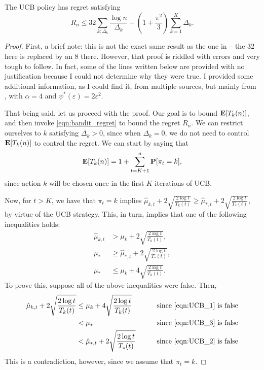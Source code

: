 \begin{theorem}
The UCB policy has regret satisfying
\[
R_n \leq 32 \sum_{k : \Delta_k} \frac{\log n}{\Delta_k} + \left(1 + \frac{\pi^2}{3} \right) \sum_{k=1}^K \Delta_k.
\]
\end{theorem}

\begin{proof}
First, a brief note: this is not the exact same result as the one in \cite[Lecture~18]{rigollet} -- the 32 here is replaced by an 8 there. However, that proof is riddled with errors and very tough to follow. In fact, some of the lines written below are provided with no justification because I could not determine why they were true. I provided some additional information, as I could find it, from multiple sources, but mainly from \cite[Theorem~2.1]{bubeck2012regret}, with $\alpha = 4$ and $\psi^*(\varepsilon) = 2 \varepsilon^2$.

That being said, let us proceed with the proof. Our goal is to bound $\mathbf{E}[T_k(n)]$, and then invoke \eqref{eqn:bandit_regret} to bound the regret $R_n$. We can restrict ourselves to $k$ satisfying $\Delta_k > 0$,  since when $\Delta_k = 0$, we do not need to control $\mathbf{E} [T_k(n)]$ to control the regret. We can start by saying that
\[
\mathbf{E}[T_k(n)] = 1 + \sum_{t=K+1}^n \mathbf{P}[\pi_t = k],
\]
since action $k$ will be chosen once in the first $K$ iterations of UCB.

Now, for $t > K$, we have that $\pi_t = k$ implies $\hat \mu_{k, t} + 2 \sqrt{\frac{2 \log t}{T_k(t)}} \geq \hat \mu_{*, t} + 2 \sqrt{\frac{2 \log t}{T_*(t)}}$, by virtue of the UCB strategy. This, in turn, implies that one of the following inequalities holds:
\begin{align}
\hat \mu_{k, t} &> \mu_k + 2 \sqrt{\frac{2 \log t}{T_k(t)}}, \label{eqn:UCB_1} \\
\mu_* &\geq \hat \mu_{*, t} + 2 \sqrt{\frac{2 \log t}{T_*(t)}}, \label{eqn:UCB_2}\\
\mu_* &\leq \mu_k + 4 \sqrt{\frac{2 \log t}{T_k(t)}}. \label{eqn:UCB_3}
\end{align}
To prove this, suppose all of the above inequalities were false. Then,
\begin{align*}
\hat \mu_{k, t} + 2 \sqrt{\frac{2 \log t}{T_k(t)}} &\leq \mu_k + 4 \sqrt{\frac{2 \log t}{T_k(t)}} &\qquad \text{since \eqref{eqn:UCB_1} is false}\\
&< \mu_* &\qquad \text{since \eqref{eqn:UCB_3} is false} \\
&< \hat \mu_{*, t} + 2 \sqrt{\frac{2 \log t}{T_*(t)}} &\qquad \text{since \eqref{eqn:UCB_2} is false}
\end{align*}
This is a contradiction, however, since we assume that $\pi_t = k$.


\end{proof}
